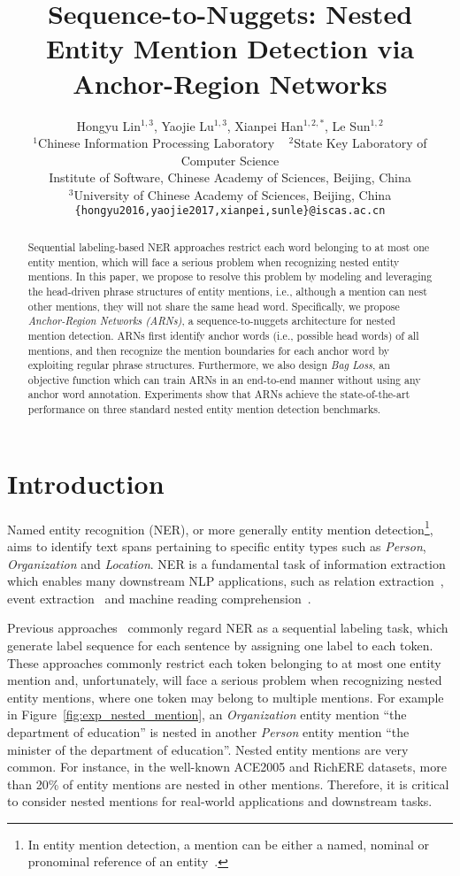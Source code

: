 \documentclass[11pt,a4paper]{article}
\title{Sequence-to-Nuggets: Nested Entity Mention Detection via \\ Anchor-Region Networks}
\author{Hongyu Lin${}^{1,3}$, Yaojie Lu${}^{1,3}$, Xianpei Han${}^{1,2,*}$, Le Sun${}^{1,2}$ \\
${}^{1}$Chinese Information Processing Laboratory ~ ${}^{2}$State Key Laboratory of Computer Science \\
Institute of Software, Chinese Academy of Sciences, Beijing, China\\
${}^{3}$University of Chinese Academy of Sciences, Beijing, China \\
 {\tt \{hongyu2016,yaojie2017,xianpei,sunle\}@iscas.ac.cn}
}
\date{}
\begin{document}
\maketitle
\begin{abstract}
  Sequential labeling-based NER approaches restrict each word belonging to at most one entity mention, which will face a serious problem when recognizing nested entity mentions. In this paper, we propose to resolve this problem by modeling and leveraging the head-driven phrase structures of entity mentions, i.e., although a mention can nest other mentions, they will not share the same head word. Specifically, we propose \emph{Anchor-Region Networks (ARNs)}, a sequence-to-nuggets architecture for nested mention detection. ARNs first identify anchor words (i.e., possible head words) of all mentions, and then recognize the mention boundaries for each anchor word by exploiting regular phrase structures. Furthermore, we also design \emph{Bag Loss}, an objective function which can train ARNs in an end-to-end manner without using any anchor word annotation. Experiments show that ARNs achieve the state-of-the-art performance on three standard nested entity mention detection benchmarks.

\end{abstract}

\section{Introduction}
{
\renewcommand{\thefootnote}{\fnsymbol{footnote}}
}
Named entity recognition (NER), or more generally entity mention detection\footnote{In entity mention detection, a mention can be either a named, nominal or pronominal reference of an entity~\cite{N18-1079}.}, aims to identify text spans pertaining to specific entity types such as \emph{Person}, \emph{Organization} and \emph{Location}. NER is a fundamental task of information extraction which enables many downstream NLP applications, such as relation extraction~\cite{guodong2005exploring,mintz2009distant}, event extraction~\cite{ji2008refining,li2013joint} and machine reading comprehension~\cite{rajpurkar2016squad,wang2016multi}.

Previous approaches~\cite{zhou2002named,chieu2002named,bender2003maximum,settles2004biomedical,lample2016neural} commonly regard NER as a sequential labeling task, which generate label sequence for each sentence by assigning one label to each token. These approaches commonly restrict each token belonging to at most one entity mention and, unfortunately, will face a serious problem when recognizing nested entity mentions, where one token may belong to multiple mentions.
For example in Figure~\ref{fig:exp_nested_mention}, an \emph{Organization} entity mention ``the department of education'' is nested in another \emph{Person} entity mention ``the minister of the department of education''. Nested entity mentions are very common.  For instance, in the well-known ACE2005 and RichERE datasets, more than 20\% of entity mentions are nested in other mentions. Therefore, it is critical to consider nested mentions for real-world applications and downstream tasks.
\end{document}
